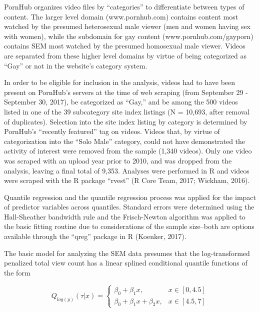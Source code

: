 \documentclass[]{article}
\begin{document}
PornHub organizes video files by ``categories'' to differentiate between
types of content. The larger level domain (www.pornhub.com) contains
content most watched by the presumed heterosexual male viewer (men and
women having sex with women), while the subdomain for gay content
(www.pornhub.com/gayporn) contains SEM most watched by the presumed
homosexual male viewer. Videos are separated from these higher level
domains by virtue of being categorized as ``Gay'' or not in the
website's category system.

In order to be eligible for inclusion in the analysis, videos had to
have been present on PornHub's servers at the time of web scraping (from
September 29 - September 30, 2017), be categorized as ``Gay,'' and be
among the 500 videos listed in one of the 39 subcategory site index
listings (N = 10,693, after removal of duplicates). Selection into the
site index listing by category is determined by PornHub's ``recently
featured'' tag on videos. Videos that, by virtue of categorization into
the ``Solo Male'' category, could not have demonstrated the activity of
interest were removed from the sample (1,340 videos). Only one video was
scraped with an upload year prior to 2010, and was dropped from the
analysis, leaving a final total of 9,353. Analyses were performed in R
and videos were scraped with the R package ``rvest'' (R Core Team, 2017;
Wickham, 2016).

Quantile regression and the quantile regression process was applied for
the impact of predictor variables across quantiles. Standard errors were
determined using the Hall-Sheather bandwidth rule and the Frisch-Newton
algorithm was applied to the basic fitting routine due to considerations
of the sample size--both are options available through the ``qreg''
package in R (Koenker, 2017).

The basic model for analyzing the SEM data presumes that the
log-transformed penalized total view count has a linear splined
conditional quantile functions of the form

\[Q_{log(y)} \left ( \tau |x \right )= \left\{\begin{matrix}
\beta _{0} + \beta _{1}x, & x \in \left [0,4.5  \right ]\\ 
\beta _{0} + \beta _{1}x + \beta _{2}x, & x \in \left [4.5,7  \right ]
\end{matrix}\right.\]
\end{document}
